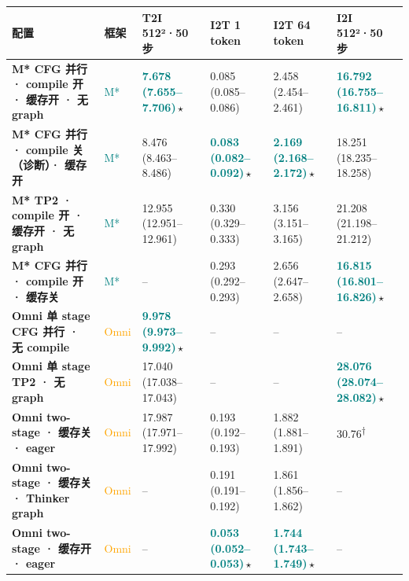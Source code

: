 \begin{tabularx}{\textwidth}{>{\bfseries}p{5.9cm} p{0.9cm} Y Y Y Y}
\toprule
{}
配置 & 框架 & T2I 512²·50 步 & I2T 1 token & I2T 64 token & I2I 512²·50 步 \\
\midrule
M* CFG 并行 · compile 开 · 缓存开 · 无 graph & \textcolor{Teal}{M*} & \textbf{\textcolor{Teal}{7.678\,\textcolor{Muted}{(7.655--7.706)}}}\,$\star$ & 0.085\,\textcolor{Muted}{(0.085--0.086)} & 2.458\,\textcolor{Muted}{(2.454--2.461)} & \textbf{\textcolor{Teal}{16.792\,\textcolor{Muted}{(16.755--16.811)}}}\,$\star$ \\
M* CFG 并行 · compile 关（诊断）· 缓存开 & \textcolor{Teal}{M*} & 8.476\,\textcolor{Muted}{(8.463--8.486)} & \textbf{\textcolor{Teal}{0.083\,\textcolor{Muted}{(0.082--0.092)}}}\,$\star$ & \textbf{\textcolor{Teal}{2.169\,\textcolor{Muted}{(2.168--2.172)}}}\,$\star$ & 18.251\,\textcolor{Muted}{(18.235--18.258)} \\
M* TP2 · compile 开 · 缓存开 · 无 graph & \textcolor{Teal}{M*} & 12.955\,\textcolor{Muted}{(12.951--12.961)} & 0.330\,\textcolor{Muted}{(0.329--0.333)} & 3.156\,\textcolor{Muted}{(3.151--3.165)} & 21.208\,\textcolor{Muted}{(21.198--21.212)} \\
M* CFG 并行 · compile 开 · 缓存关 & \textcolor{Teal}{M*} & -- & 0.293\,\textcolor{Muted}{(0.292--0.293)} & 2.656\,\textcolor{Muted}{(2.647--2.658)} & \textbf{\textcolor{Teal}{16.815\,\textcolor{Muted}{(16.801--16.826)}}}\,$\star$ \\
\midrule
Omni 单 stage CFG 并行 · 无 compile & \textcolor{Orange}{Omni} & \textbf{\textcolor{Teal}{9.978\,\textcolor{Muted}{(9.973--9.992)}}}\,$\star$ & -- & -- & -- \\
Omni 单 stage TP2 · 无 graph & \textcolor{Orange}{Omni} & 17.040\,\textcolor{Muted}{(17.038--17.043)} & -- & -- & \textbf{\textcolor{Teal}{28.076\,\textcolor{Muted}{(28.074--28.082)}}}\,$\star$ \\
Omni two-stage · 缓存关 · eager & \textcolor{Orange}{Omni} & 17.987\,\textcolor{Muted}{(17.971--17.992)} & 0.193\,\textcolor{Muted}{(0.192--0.193)} & 1.882\,\textcolor{Muted}{(1.881--1.891)} & \textcolor{Muted}{30.76\textsuperscript{†}} \\
Omni two-stage · 缓存关 · Thinker graph & \textcolor{Orange}{Omni} & -- & 0.191\,\textcolor{Muted}{(0.191--0.192)} & 1.861\,\textcolor{Muted}{(1.856--1.862)} & -- \\
Omni two-stage · 缓存开 · eager & \textcolor{Orange}{Omni} & -- & \textbf{\textcolor{Teal}{0.053\,\textcolor{Muted}{(0.052--0.053)}}}\,$\star$ & \textbf{\textcolor{Teal}{1.744\,\textcolor{Muted}{(1.743--1.749)}}}\,$\star$ & -- \\
\bottomrule
\end{tabularx}
